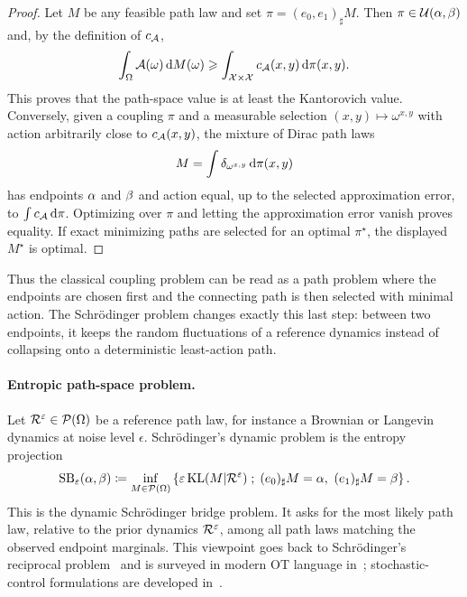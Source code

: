 \begin{proof}
	Let $M$ be any feasible path law and set $\pi=(e_0,e_1)_\sharp M$. Then $\pi\in\mathcal{U}(\alpha,\beta)$ and, by the definition of $c_{\mathcal{A}}$,
	\[
		\int_\Omega \mathcal{A}(\omega)\,\mathrm{d} M(\omega)
		\geqslant
		\int_{\mathcal{X}\times\mathcal{X}} c_{\mathcal{A}}(x,y)\,\mathrm{d}\pi(x,y).
	\]
	This proves that the path-space value is at least the Kantorovich value. Conversely, given a coupling $\pi$ and a measurable selection $(x,y)\mapsto\omega^{x,y}$ with action arbitrarily close to $c_{\mathcal{A}}(x,y)$, the mixture of Dirac path laws
	\[
		M=\int\delta_{\omega^{x,y}}\,\mathrm{d}\pi(x,y)
	\]
	has endpoints $\alpha$ and $\beta$ and action equal, up to the selected approximation error, to $\int c_{\mathcal{A}}\,\mathrm{d}\pi$. Optimizing over $\pi$ and letting the approximation error vanish proves equality. If exact minimizing paths are selected for an optimal $\pi^\star$, the displayed $M^\star$ is optimal.
\end{proof}

Thus the classical coupling problem can be read as a path problem where the endpoints are chosen first and the connecting path is then selected with minimal action. The Schr\"odinger problem changes exactly this last step: between two endpoints, it keeps the random fluctuations of a reference dynamics instead of collapsing onto a deterministic least-action path.

\paragraph{Entropic path-space problem.}

Let $\mathcal{R}^\varepsilon\in\mathcal{P}(\Omega)$ be a reference path law, for instance a Brownian or Langevin dynamics at noise level $\epsilon$. Schr\"odinger's dynamic problem is the entropy projection
\begin{equation}\label{eq-schrodinger-path-space}
	\mathrm{SB}_\varepsilon(\alpha,\beta)
	\coloneqq
	\inf_{M\in\mathcal{P}(\Omega)}
	\left\{ 
		\varepsilon\operatorname{KL}(M|\mathcal{R}^\varepsilon)
	 \;;\; 
		(e_0)_\sharp M=\alpha,\ (e_1)_\sharp M=\beta
	 \right\}.
\end{equation}
This is the dynamic Schr\"odinger bridge problem. It asks for the most likely path law, relative to the prior dynamics $\mathcal{R}^\varepsilon$, among all path laws matching the observed endpoint marginals. This viewpoint goes back to Schr\"odinger's reciprocal problem~\cite{Schroedinger31} and is surveyed in modern OT language in~\cite{leonard2012schrodinger,LeonardSchroedinger}; stochastic-control formulations are developed in~\cite{chen2016relation}.

